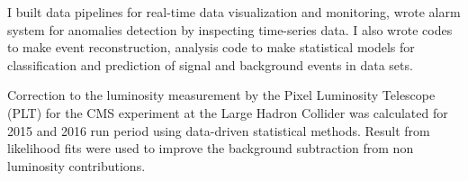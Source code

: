 I built data pipelines for real-time data visualization and monitoring, wrote alarm system for anomalies detection by inspecting time-series data. I also wrote codes to make event reconstruction, analysis code to make statistical models for classification and prediction of  signal and background events in data sets.

Correction to the luminosity measurement by the Pixel Luminosity Telescope (PLT) for the CMS experiment at the Large Hadron Collider was calculated for 2015 and 2016 run period using data-driven statistical methods. Result from likelihood fits were used to improve the background subtraction from non luminosity contributions.

